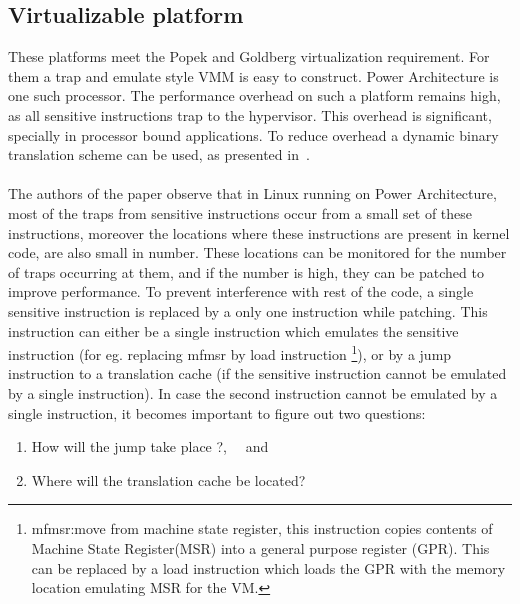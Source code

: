 \documentclass[seminar,twoside]{iitbreport}
\begin{document}
  \subsection{ Virtualizable platform }
  These platforms meet the Popek and Goldberg virtualization requirement. For them a trap and emulate style VMM is easy to construct.
  Power Architecture is one such processor. The performance overhead on such a platform remains high, as all sensitive instructions trap to the hypervisor.
  This overhead is significant, specially in processor bound applications. To reduce overhead a dynamic binary translation scheme can be used, as presented in~\cite{Mittal:2013:EVE:2499368.2451163}.
  \\\\
  The authors of the paper observe that in Linux running on Power Architecture, most of the traps from sensitive instructions occur from a small set of these instructions, moreover 
  the locations where these instructions are present in kernel code, are also small in number. These locations can be monitored for the number of traps occurring at them,
  and if the number is high, they can be patched to improve performance. To prevent interference  with rest of the code, a single sensitive instruction is
  replaced by a only one instruction while patching. This instruction can either be a single instruction which emulates the sensitive instruction
  (for eg. replacing mfmsr by load instruction \footnote{mfmsr:move from machine state register, this instruction 
  copies contents of Machine State Register(MSR) into a general purpose register (GPR). This can be replaced by a load instruction which loads 
  the GPR with the memory location emulating MSR for the VM.}), or by a jump instruction to a translation cache (if the sensitive instruction cannot be emulated by a single instruction).
  In case the second instruction cannot be emulated by a single instruction, it becomes important to figure out two questions: 
  
  \begin{enumerate}
  \renewcommand{\labelenumi}{(\roman{enumi})}
   \item How will the jump take place ?,  ~~and
   \item Where will the translation cache be located?
  \end{enumerate}
\end{document}
